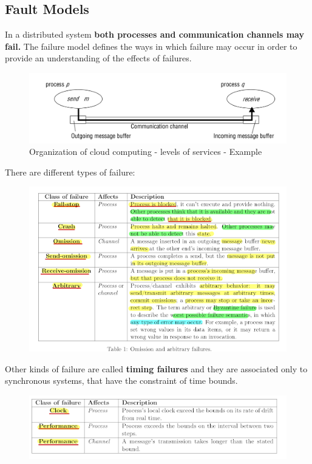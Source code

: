 \subsection{Fault Models}
In a distributed system \textbf{both processes and communication channels may fail.} The failure model defines the ways in which failure may occur in order to provide an understanding of the effects of failures.
\begin{figure}[!h]
            \centering
            \includegraphics[width=.7\linewidth]{images/modelOfSystems/ArbitraryFailure.jpeg}
            \caption{Organization of cloud computing - levels of services - Example
}
    \end{figure}
There are different types of failure:
\begin{figure}[!h]
            \centering
            \includegraphics[width=.8\linewidth]{images/modelOfSystems/table1.png}
    \end{figure}
    
Other kinds of failure are called \textbf{timing failures} and they are associated only to synchronous
systems, that have the constraint of time bounds.
\begin{figure}[!h]
            \centering
            \includegraphics[width=.8\linewidth]{images/modelOfSystems/table2.png}
    \end{figure}

